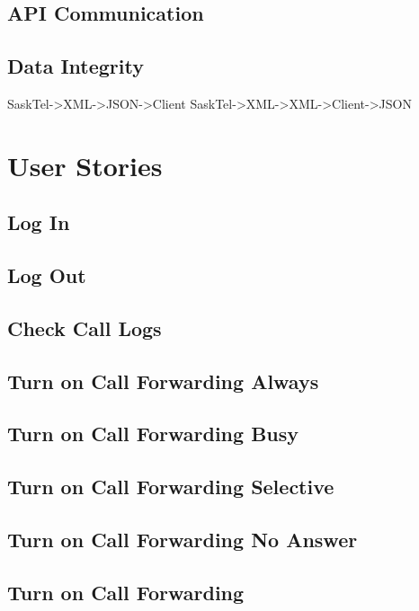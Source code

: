 \documentclass[12pt]{article}
\begin{document}
\subsection{API Communication}

\subsection{Data Integrity}
	SaskTel->XML->JSON->Client
	SaskTel->XML->XML->Client->JSON


\newpage

\section{User Stories}

\subsection{Log In}

\subsection{Log Out}

\subsection{Check Call Logs}

\subsection{Turn on Call Forwarding Always}

\subsection{Turn on Call Forwarding Busy}

\subsection{Turn on Call Forwarding Selective}

\subsection{Turn on Call Forwarding No Answer}

\subsection{Turn on Call Forwarding}
\end{document}
